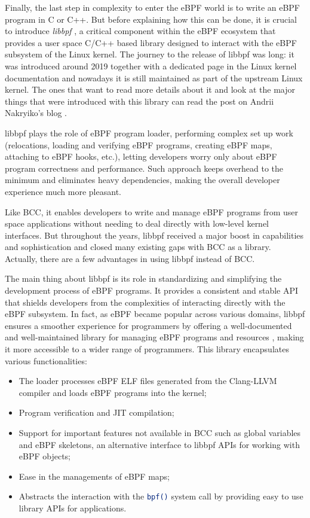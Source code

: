 Finally, the last step in complexity to enter the eBPF world is to write an eBPF program in C or C++.
But before explaining how this can be done, it is crucial to introduce \textit{libbpf} \cite{libbpfGitHub}, a critical component within the eBPF ecosystem that provides a user space C/C++ based library designed to interact with the eBPF subsystem of the Linux kernel. 
The journey to the release of libbpf was long: it was introduced around 2019 together with a dedicated page in the Linux kernel documentation \cite{libbpfPageLinuxKernelDOc} and nowadays it is still maintained as part of the upstream Linux kernel.
The ones that want to read more details about it and look at the major things that were introduced with this library can read the post on Andrii Nakryiko's blog \cite{libbpfJourney}.

libbpf plays the role of eBPF program loader, performing complex set up work (relocations, loading and verifying eBPF programs, creating eBPF maps, attaching to eBPF hooks, etc.), letting developers worry only about eBPF program correctness and performance. 
Such approach keeps overhead to the minimum and eliminates heavy dependencies, making the overall developer experience much more pleasant.

Like BCC, it enables developers to write and manage eBPF programs from user space applications without needing to deal directly with low-level kernel interfaces.
But throughout the years, libbpf received a major boost in capabilities and sophistication and closed many existing gaps with BCC as a library.
Actually, there are a few advantages in using libbpf instead of BCC.

The main thing about libbpf is its role in standardizing and simplifying the development process of eBPF programs. 
It provides a consistent and stable API that shields developers from the complexities of interacting directly with the eBPF subsystem. 
In fact, as eBPF became popular across various domains, libbpf ensures a smoother experience for programmers by offering a well-documented and well-maintained library for managing eBPF programs and resources \cite{libbpfDocumentation}, making it more accessible to a wider range of programmers.
This library encapsulates various functionalities:

\begin{itemize}
	\item 
		The loader processes eBPF ELF files generated from the Clang-LLVM compiler and loads eBPF programs into the kernel;
	\item 
		Program verification and JIT compilation;
	\item 
		Support for important features not available in BCC such as global variables and eBPF skeletons, an alternative interface to libbpf APIs for working with eBPF objects;
	\item 
		Ease in the managements of eBPF maps;
	\item 
		Abstracts the interaction with the \colorbox{backcolour}{\lstinline[style=commandline, language=bash, breaklines=true]|bpf()|} system call by providing easy to use library APIs for applications.
\end{itemize}

